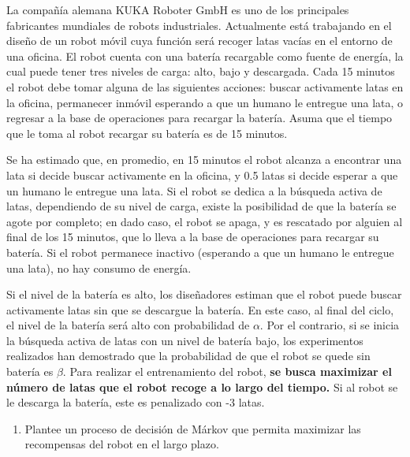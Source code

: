\noindent La compañía alemana KUKA Roboter GmbH es uno de los principales fabricantes mundiales de robots industriales. Actualmente está trabajando en el diseño de un robot móvil cuya función será recoger latas vacías en el entorno de una oficina. El robot cuenta con una batería recargable como fuente de energía, la cual puede tener tres niveles de carga: alto, bajo y descargada. Cada 15 minutos el robot debe tomar alguna de las siguientes acciones: buscar activamente latas en la oficina, permanecer inmóvil esperando a que un humano le entregue una lata, o regresar a la base de operaciones para recargar la batería. Asuma que el tiempo que le toma al robot recargar su batería es de 15 minutos. 

\noindent Se ha estimado que, en promedio, en 15 minutos el robot alcanza a encontrar una lata si decide buscar activamente en la oficina, y 0.5 latas si decide esperar a que un humano le entregue una lata. Si el robot se dedica a la búsqueda activa de latas, dependiendo de su nivel de carga,  existe la posibilidad de que la batería se agote por completo; en dado caso, el robot se apaga, y es rescatado por alguien al final de los 15 minutos, que lo lleva a la base de operaciones para recargar su batería. Si el robot permanece inactivo (esperando a que un humano le entregue una lata), no hay consumo de energía. 

\noindent Si el nivel de la batería es alto, los diseñadores estiman que el robot puede buscar activamente latas sin que se descargue la batería. En este caso, al final del ciclo, el nivel de la batería será alto con probabilidad de $\alpha$. Por el contrario, si se inicia la búsqueda activa de latas con un nivel de batería bajo, los experimentos realizados han demostrado que la probabilidad de que el robot se quede sin batería es $\beta$. Para realizar el entrenamiento del robot, \textbf{se busca maximizar el número de latas que el robot recoge a lo largo del tiempo.} Si al robot se le descarga la batería, este es penalizado con -3 latas. 
    \begin{enumerate}[label=\alph*.] 
        \item Plantee un proceso de decisión de Márkov que permita maximizar las recompensas del robot en el largo plazo. \\
    \end{enumerate}

